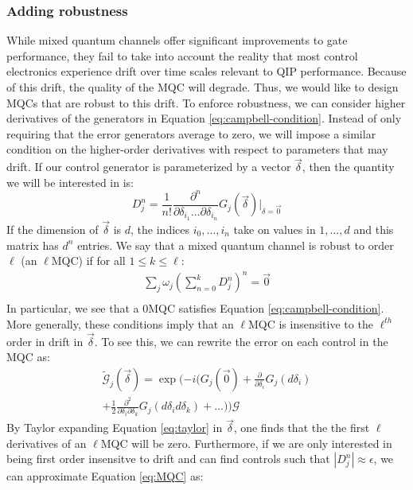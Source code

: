 \documentclass[aps,nofootinbib,pra,notitlepage,twocolumn]{revtex4-1}
\newcommand{\actual}{\ensuremath{\tilde{\mathcal{G}}}}
\newcommand{\target}{\ensuremath{{\mathcal{G}}}}
\begin{document}
\subsubsection{Adding robustness} %
\label{sub:adding_robustness}
While mixed quantum channels offer significant improvements to gate performance, they fail to take into account the reality that most control electronics experience drift over time scales relevant to QIP performance. Because of this drift, the quality of the MQC will degrade. Thus, we would like to design MQCs that are robust to this drift. To enforce robustness, we can consider higher derivatives of the generators in Equation \ref{eq:campbell-condition}. Instead of only requiring that the error generators average to zero, we will impose a similar condition on the higher-order derivatives with respect to parameters that may drift. If our control generator is parameterized by a vector $\vec{\delta}$, then the quantity we will be interested in is:
\begin{equation}
D^n_j = \frac{1}{n!}\frac{\partial^{n}}{\partial\delta_{i_1}\ldots\partial\delta_{i_n}}G_j(\vec{\delta})|_{\delta=\vec{0}}
\end{equation}
If the dimension of $\vec{\delta}$ is $d$, the indices $i_0, \ldots, i_n$ take on values in $1, \ldots, d$ and this matrix has $d^n$ entries. 
We say that a mixed quantum channel is robust to order $\ell$ (an $\ell$MQC) if for all $1 \leq k \leq \ell$:
\begin{equation}\label{eq:MQC}
\begin{gathered}
\sum_j\omega_j(\sum_{n=0}^k D^n_j)^n = \vec{0}\\
\end{gathered}
\end{equation}
In particular, we see that a 0MQC satisfies Equation \ref{eq:campbell-condition}. More generally, these conditions imply that an $\ell$MQC is insensitive to the $\ell^{th}$ order in drift in $\vec{\delta}$. To see this, we can rewrite the error on each control in the MQC as:
\begin{equation}\label{eq:taylor}
\begin{gathered}
\actual_j(\vec{\delta}) = \exp(-i(G_j(\vec{0}) + \frac{\partial}{\partial\delta_i}G_j(d\delta_i)\\ +  \frac{1}{2}\frac{\partial^2}{\partial\delta_i\partial\delta_k} G_j(d\delta_i d\delta_k) + \ldots))\target
\end{gathered}
\end{equation}
By Taylor expanding Equation \ref{eq:taylor} in $\vec{\delta}$, one finds that the the first $\ell$ derivatives of an $\ell$MQC will be zero. Furthermore, if we are only interested in being first order insensitve to drift and can find controls such that $|D_j^n|\approx\epsilon$, we can approximate Equation \ref{eq:MQC} as:
\end{document}
